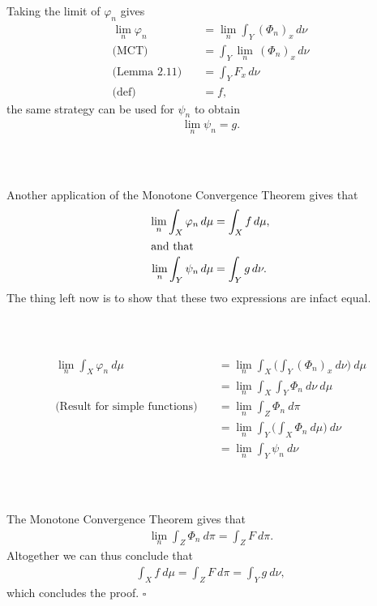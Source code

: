 \documentclass{beamer}
\numberwithin{equation}{section}
\begin{document}
\begin{frame}\frametitle{{\normalsize \secname} \\ {\large \subsecname}}
    Taking the limit of $\varphi_n$ gives
    \begin{align}
        \lim_n \varphi_n &= \lim_n \int_Y (\varPhi_n)_x \, d\nu \\
        \text{(MCT)} \quad &= \int_Y \lim_n \, (\varPhi_n)_x \, d\nu \\
        \text{(Lemma 2.11)} \quad &= \int_Y F_x \, d\nu \\
        \text{(def)} \quad &= f,
    \end{align}
    the same strategy can be used for $\psi_n$ to obtain
    \begin{align}
        \lim_n \psi_n = g.
    \end{align}
\end{frame}

\begin{frame}\frametitle{{\normalsize \secname} \\ {\large \subsecname}}
    Another application of the Monotone Convergence Theorem gives that
    \begin{align}
        \lim_n \int_X \varphi_n \, d \mu &= \int_X f \, d \mu,\\
        \intertext{and that}
        \lim_n \int_Y \psi_n \, d \mu &= \int_Y g \, d \nu.
    \end{align}
    The thing left now is to show that these two expressions are infact equal.
\end{frame}

\begin{frame}\frametitle{{\normalsize \secname} \\ {\large \subsecname}}
    \begingroup
    \small
    \begin{align}
        \lim_{n} \int_X \varphi_n\: d \mu &= \lim_{n} \int_X \bigg( \int_Y   (\Phi_n)_x \:d \nu \bigg)\: d \mu \\
        &= \lim_{n} \int_X \int_Y   \Phi_n \:d \nu \:d \mu \\
        \text{(Result for simple functions)} \quad&= \lim_{n} \int_Z   \Phi_n\: d \pi \\
        &= \lim_{n} \int_Y \Big(\int_X   \Phi_n \:d \mu\Big) \: d \nu \\
        &=  \lim_{n} \int_Y \psi_n \: d \nu
    \end{align}
    \endgroup
\end{frame}

\begin{frame}\frametitle{{\normalsize \secname} \\ {\large \subsecname}}
    The Monotone Convergence Theorem gives that
    \begin{align}
        \lim_{n} \int_Z \Phi_n \: d \pi = \int_Z F \: d \pi.
    \end{align}
    Altogether we can thus conclude that
    \begin{align*}
        \int_X f\ d \mu = \int_Z F \: d \pi = \int_Y g\ d \nu,
    \end{align*}
    which concludes the proof. \hfill $\square$
\end{frame}
\end{document}

